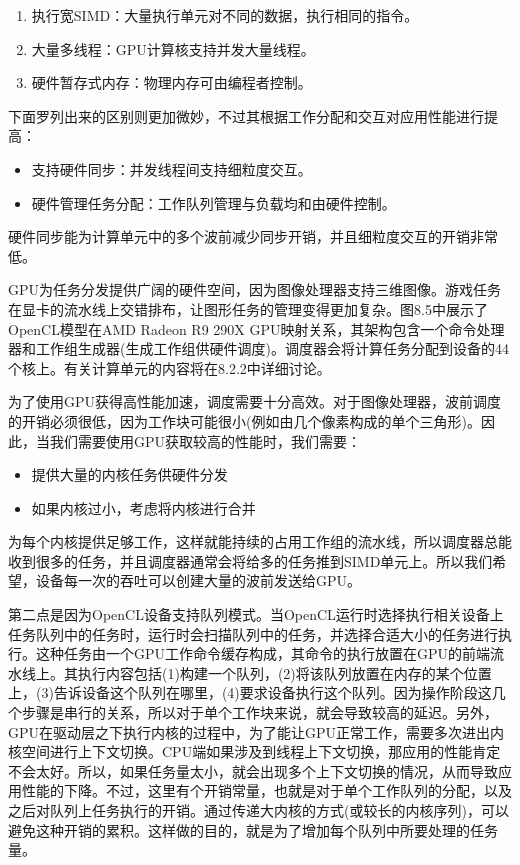 \begin{enumerate}
\item 执行宽SIMD：大量执行单元对不同的数据，执行相同的指令。
\item 大量多线程：GPU计算核支持并发大量线程。
\item 硬件暂存式内存：物理内存可由编程者控制。
\end{enumerate}

下面罗列出来的区别则更加微妙，不过其根据工作分配和交互对应用性能进行提高：

\begin{itemize}
\item 支持硬件同步：并发线程间支持细粒度交互。
\item 硬件管理任务分配：工作队列管理与负载均和由硬件控制。
\end{itemize}

硬件同步能为计算单元中的多个波前减少同步开销，并且细粒度交互的开销非常低。

GPU为任务分发提供广阔的硬件空间，因为图像处理器支持三维图像。游戏任务在显卡的流水线上交错排布，让图形任务的管理变得更加复杂。图8.5中展示了OpenCL模型在AMD Radeon R9 290X GPU映射关系，其架构包含一个命令处理器和工作组生成器(生成工作组供硬件调度)。调度器会将计算任务分配到设备的44个核上。有关计算单元的内容将在8.2.2中详细讨论。


为了使用GPU获得高性能加速，调度需要十分高效。对于图像处理器，波前调度的开销必须很低，因为工作块可能很小(例如由几个像素构成的单个三角形)。因此，当我们需要使用GPU获取较高的性能时，我们需要：

\begin{itemize}
\item 提供大量的内核任务供硬件分发
\item 如果内核过小，考虑将内核进行合并
\end{itemize}

为每个内核提供足够工作，这样就能持续的占用工作组的流水线，所以调度器总能收到很多的任务，并且调度器通常会将给多的任务推到SIMD单元上。所以我们希望，设备每一次的吞吐可以创建大量的波前发送给GPU。

第二点是因为OpenCL设备支持队列模式。当OpenCL运行时选择执行相关设备上任务队列中的任务时，运行时会扫描队列中的任务，并选择合适大小的任务进行执行。这种任务由一个GPU工作命令缓存构成，其命令的执行放置在GPU的前端流水线上。其执行内容包括(1)构建一个队列，(2)将该队列放置在内存的某个位置上，(3)告诉设备这个队列在哪里，(4)要求设备执行这个队列。因为操作阶段这几个步骤是串行的关系，所以对于单个工作块来说，就会导致较高的延迟。另外，GPU在驱动层之下执行内核的过程中，为了能让GPU正常工作，需要多次进出内核空间进行上下文切换。CPU端如果涉及到线程上下文切换，那应用的性能肯定不会太好。所以，如果任务量太小，就会出现多个上下文切换的情况，从而导致应用性能的下降。不过，这里有个开销常量，也就是对于单个工作队列的分配，以及之后对队列上任务执行的开销。通过传递大内核的方式(或较长的内核序列)，可以避免这种开销的累积。这样做的目的，就是为了增加每个队列中所要处理的任务量。

